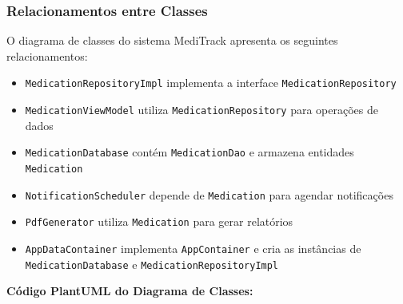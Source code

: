 \documentclass[12pt]{article}
\begin{document}
\subsubsection{Relacionamentos entre Classes}

O diagrama de classes do sistema MediTrack apresenta os seguintes relacionamentos:

\begin{itemize}
    \item \texttt{MedicationRepositoryImpl} implementa a interface \texttt{MedicationRepository}
    \item \texttt{MedicationViewModel} utiliza \texttt{MedicationRepository} para operações de dados
    \item \texttt{MedicationDatabase} contém \texttt{MedicationDao} e armazena entidades \texttt{Medication}
    \item \texttt{NotificationScheduler} depende de \texttt{Medication} para agendar notificações
    \item \texttt{PdfGenerator} utiliza \texttt{Medication} para gerar relatórios
    \item \texttt{AppDataContainer} implementa \texttt{AppContainer} e cria as instâncias de \texttt{MedicationDatabase} e \texttt{MedicationRepositoryImpl}
\end{itemize}

\textbf{Código PlantUML do Diagrama de Classes:}
\end{document}
